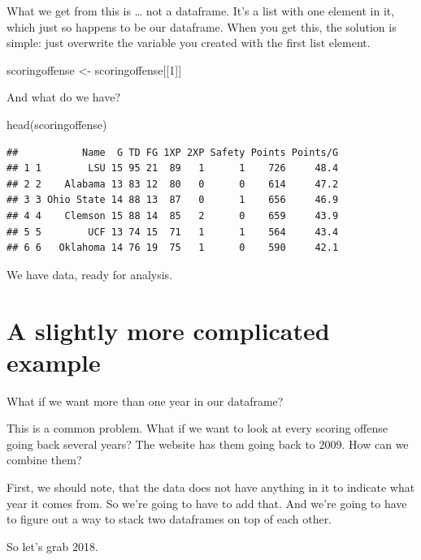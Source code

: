 \documentclass[
]{book}
\newenvironment{Shaded}{\begin{snugshade}}{\end{snugshade}}
\newcommand{\DecValTok}[1]{\textcolor[rgb]{0.00,0.00,0.81}{#1}}
\newcommand{\FunctionTok}[1]{\textcolor[rgb]{0.00,0.00,0.00}{#1}}
\newcommand{\NormalTok}[1]{#1}
\newcommand{\OtherTok}[1]{\textcolor[rgb]{0.56,0.35,0.01}{#1}}
\begin{document}
What we get from this is \ldots{} not a dataframe. It's a list with one element in it, which just so happens to be our dataframe. When you get this, the solution is simple: just overwrite the variable you created with the first list element.

\begin{Shaded}
\begin{Highlighting}[]
\NormalTok{scoringoffense }\OtherTok{\textless{}{-}}\NormalTok{ scoringoffense[[}\DecValTok{1}\NormalTok{]]}
\end{Highlighting}
\end{Shaded}

And what do we have?

\begin{Shaded}
\begin{Highlighting}[]
\FunctionTok{head}\NormalTok{(scoringoffense)}
\end{Highlighting}
\end{Shaded}

\begin{verbatim}
##           Name  G TD FG 1XP 2XP Safety Points Points/G
## 1 1        LSU 15 95 21  89   1      1    726     48.4
## 2 2    Alabama 13 83 12  80   0      0    614     47.2
## 3 3 Ohio State 14 88 13  87   0      1    656     46.9
## 4 4    Clemson 15 88 14  85   2      0    659     43.9
## 5 5        UCF 13 74 15  71   1      1    564     43.4
## 6 6   Oklahoma 14 76 19  75   1      0    590     42.1
\end{verbatim}

We have data, ready for analysis.

\hypertarget{a-slightly-more-complicated-example}{%
\section{A slightly more complicated example}\label{a-slightly-more-complicated-example}}

What if we want more than one year in our dataframe?

This is a common problem. What if we want to look at every scoring offense going back several years? The website has them going back to 2009. How can we combine them?

First, we should note, that the data does not have anything in it to indicate what year it comes from. So we're going to have to add that. And we're going to have to figure out a way to stack two dataframes on top of each other.

So let's grab 2018.
\end{document}
